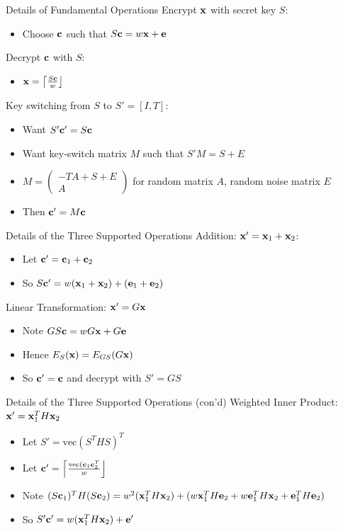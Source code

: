 \documentclass{beamer}
\newcommand{\itz}[1]{\begin{itemize}#1\end{itemize}} %
\newcommand{\bbc}{{\bf c}} %
\newcommand{\bbe}{{\bf e}} %
\newcommand{\bbx}{{\bf x}} %
\begin{document}
\begin{frame}{Details of Fundamental Operations}
Encrypt $\bbx$ with secret key $S$:
\itz{
\item{ Choose $\bbc$ such that $S\bbc = w\bbx + \bbe$ }
}
\vspace{.15in}
Decrypt $\bbc$ with $S$:
\itz{
\item{$\bbx = \left\lceil \frac{S\bbc}{w} \right\rfloor$}
}
\vspace{.15in}
Key switching from $S$ to $S'=[I,T]$:
\itz{
\item{Want $S'\bbc' = S\bbc$}
\item{Want key-switch matrix $M$ such that $S'M=S+E$}
\item{$M=\begin{pmatrix}
-TA + S + E \\
A 
\end{pmatrix}$ for random matrix $A$, random noise matrix $E$}
\item{Then $\bbc'=M\bbc$}
}
\end{frame}





\begin{frame}{Details of the Three Supported Operations}
Addition: $\bbx' = \bbx_1 + \bbx_2$:
\itz{
\item{Let $\bbc' = \bbc_1 + \bbc_2$}
\item{So $S\bbc'=w(\bbx_1+\bbx_2)+(\bbe_1+\bbe_2)$}
}
\vspace{.15in}
Linear Transformation: $\bbx' = G\bbx$
\itz{
\item{Note $GS\bbc = wG\bbx + G\bbe$}
\item{Hence $E_S(\bbx) = E_{GS}(G\bbx)$}
\item{So $\bbc'=\bbc$ and decrypt with $S' = GS$}
}
\end{frame}




\begin{frame}{Details of the Three Supported Operations (con'd)}
Weighted Inner Product: $\bbx' = \bbx_1^T H \bbx_2$
\itz{
\item{Let $S'=\text{vec}(S^T H S)^T $}
\item{Let $\bbc'=\left\lceil \frac{\text{vec}(\bbc_1 \bbc_2^T}{w} \right\rfloor$}
\vspace{.07in}
\item{Note $(S\bbc_1)^T H (S\bbc_2) = w^2(\bbx_1^T H \bbx_2)+(w\bbx_1^T H \bbe_2 + w\bbe_1^T H \bbx_2 + \bbe_1^T H \bbe_2)$}
\vspace{.07in}
\item{So $S'\bbc' = w(\bbx_1^T H \bbx_2) + \bbe'$}
}
\end{frame}
\end{document}
